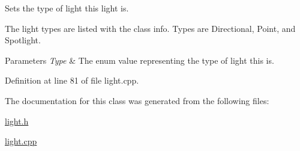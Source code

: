 Sets the type of light this light is. 

The light types are listed with the class info. Types are Directional, Point, and Spotlight. 
\begin{DoxyParams}{Parameters}
{\em Type} & The enum value representing the type of light this is. \\
\hline
\end{DoxyParams}


Definition at line 81 of file light.cpp.



The documentation for this class was generated from the following files:\begin{DoxyCompactItemize}
\item 
\hyperlink{light_8h}{light.h}\item 
\hyperlink{light_8cpp}{light.cpp}\end{DoxyCompactItemize}
